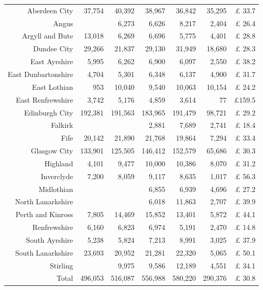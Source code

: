 \documentclass[
  12pt,
]{article}
\begin{document}
\begin{longtable}[t]{rrrrrrr}
\endfoot
\bottomrule
\endlastfoot
Aberdeen City & 37,754 & 40,392 & 38,967 & 36,842 & 35,295 & £ 33.7\\
Angus &  & 6,273 & 6,626 & 8,217 & 2,404 & £ 26.4\\
Argyll and Bute & 13,018 & 6,269 & 6,696 & 5,775 & 4,401 & £ 28.8\\
Dundee City & 29,266 & 21,837 & 29,130 & 31,949 & 18,680 & £ 28.3\\
East Ayrshire & 5,995 & 6,262 & 6,900 & 6,097 & 2,550 & £ 38.2\\
East Dunbartonshire & 4,704 & 5,301 & 6,348 & 6,137 & 4,900 & £ 31.7\\
East Lothian & 953 & 10,040 & 9,540 & 10,063 & 10,154 & £ 24.2\\
East Renfrewshire & 3,742 & 5,176 & 4,859 & 3,614 & 77 & £159.5\\
Edinburgh City & 192,381 & 191,563 & 183,965 & 191,479 & 98,721 & £ 29.2\\
Falkirk &  &  & 2,881 & 7,689 & 2,741 & £ 18.4\\
Fife & 20,142 & 21,890 & 21,768 & 19,864 & 7,294 & £ 33.4\\
Glasgow City & 133,901 & 125,505 & 146,412 & 152,579 & 65,686 & £ 30.3\\
Highland & 4,101 & 9,477 & 10,000 & 10,386 & 8,070 & £ 31.2\\
Inverclyde & 7,200 & 8,059 & 9,117 & 8,635 & 1,017 & £ 56.3\\
Midlothian &  &  & 6,855 & 6,939 & 4,696 & £ 27.2\\
North Lanarkshire &  &  & 6,018 & 11,863 & 2,707 & £ 39.9\\
Perth and Kinross & 7,805 & 14,469 & 15,852 & 13,401 & 5,872 & £ 44.1\\
Renfrewshire & 6,160 & 6,823 & 6,974 & 5,191 & 2,470 & £ 14.8\\
South Ayrshire & 5,238 & 5,824 & 7,213 & 8,991 & 3,025 & £ 37.9\\
South Lanarkshire & 23,693 & 20,952 & 21,281 & 22,320 & 5,065 & £ 50.1\\
Stirling &  & 9,975 & 9,586 & 12,189 & 4,551 & £ 34.1\\
\midrule
Total & 496,053 & 516,087 & 556,988 & 580,220 & 290,376 & £ 30.8\\*
\end{longtable}
\endgroup{}
\newpage
\begingroup\fontsize{10}{12}\selectfont
\end{document}
